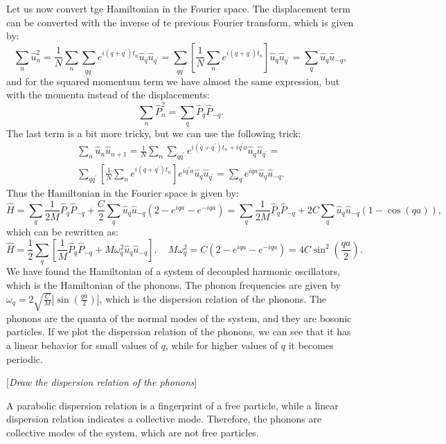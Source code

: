 Let us now convert tge Hamiltonian in the Fourier space. The displacement term can be converted with the inverse of te previous Fourier transform, which is given by:
\[
    \sum_{n} \hat{u}_n^2 = \frac{1}{N}\sum_{n} \sum_{q q^{\prime}} e^{i(q + q^{\prime}) t_n} \hat{u}_q \hat{u}_{q^{\prime}} = \sum_{q q^{\prime}} \left[\frac{1}{N} \sum_{n} e^{i (q + q^{\prime}) t_n} \right] \hat{u}_q \hat{u}_{q^{\prime}} = \sum_{q} \hat{u}_q \hat{u}_{-q},
\]
and for the squared momentum term we have almost the same expression, but with the momenta instead of the displacements:
\[
    \sum_{n} \hat{P}_n^2 = \sum_{q} \hat{P}_q \hat{P}_{-q}.
\]
The last term is a bit more tricky, but we can use the following trick:
\[
    \begin{aligned}
        \sum_{n} \hat{u}_n \hat{u}_{n+1} = \frac{1}{N} \sum_{n} \sum_{q q^{\prime}} e^{i (q + q^{\prime}) t_n + i q^{\prime} a} \hat{u}_q \hat{u}_{q^{\prime}} = \\
        \sum_{q q^{\prime}} \left[ \frac{1}{N} \sum_{n} e^{i (q + q^{\prime}) t_n} \right] e^{i q^{\prime} a} \hat{u}_q \hat{u}_{q^{\prime}} = \sum_{q} e^{i q a} \hat{u}_q \hat{u}_{-q}.
    \end{aligned}
\]
Thus the Hamiltonian in the Fourier space is given by:
\[
    \hat{H} = \sum_{q} \frac{1}{2M} \hat{P}_q \hat{P}_{-q} + \frac{C}{2} \sum_{q} \hat{u}_q \hat{u}_{-q} (2 - e^{i q a} - e^{-i q a}) = \sum_{q}\frac{1}{2M} \hat{P}_q \hat{P}_{-q} + 2C \sum_{q}  \hat{u}_q \hat{u}_{-q}(1 - \cos(q a)),
\]
which can be rewritten as:
\[
    \hat{H} = \frac{1}{2} \sum_{q} \left[ \frac{1}{M} \hat{P}_q \hat{P}_{-q} + M \omega_q^2 \hat{u}_q \hat{u}_{-q} \right], \quad M \omega_q^2 = C (2 - e^{i q a} - e^{-i q a}) = 4C \sin^2\left(\frac{q a}{2}\right).
\]
We have found the Hamiltonian of a system of decoupled harmonic oscillators, which is the Hamiltonian of the phonons. The phonon frequencies are given by \(\omega_q = 2 \sqrt{\frac{C}{M}} \left\vert \sin\left(\frac{q a}{2}\right) \right\vert \), which is the dispersion relation of the phonons. The phonons are the quanta of the normal modes of the system, and they are bosonic particles. If we plot the dispersion relation of the phonons, we can see that it has a linear behavior for small values of $q$, while for higher values of $q$ it becomes periodic.

    [\textit{Draw the dispersion relation of the phonons}]

A parabolic dispersion relation is a fingerprint of a free particle, while a linear dispersion relation indicates a collective mode. Therefore, the phonons are collective modes of the system, which are not free particles.

